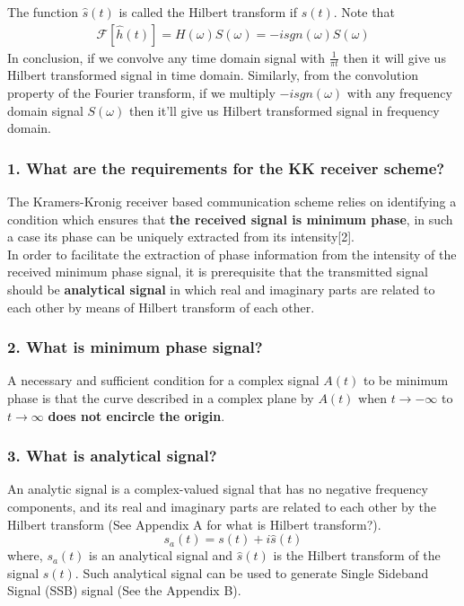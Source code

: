 The function $\hat{s}(t)$ is called the Hilbert transform if $s(t)$. Note that
\begin{equation}
\begin{split}
\mathcal{F}[\hat{h}(t)]=H(\omega)S(\omega)=-isgn(\omega)S(\omega)
\end{split}
\label{}
\end{equation}
In conclusion, if we convolve any time domain signal with $\frac{1}{\pi t}$ then it will give us Hilbert transformed signal in time domain. Similarly, from the convolution property of the Fourier transform, if we multiply $-isgn(\omega)$ with any frequency domain signal $S(\omega)$ then it'll give us Hilbert transformed signal in frequency domain.


\subsubsection{1. What are the requirements for the KK receiver scheme?}
The Kramers-Kronig receiver based communication scheme relies on identifying a condition which ensures that \textbf{the received signal is minimum phase}, in such a case its phase can be uniquely extracted from its intensity[2].\\ In order to facilitate the extraction of phase information from the intensity of the received minimum phase signal, it is prerequisite that the transmitted signal should be \textbf{analytical signal} in which real and imaginary parts are related to each other by means of Hilbert transform of each other.

\subsubsection{2. What is minimum phase signal?}
A necessary and sufficient condition for a complex signal $A(t)$ to be minimum phase is that the curve described in a complex plane by $A(t)$ when $t\rightarrow -\infty$ to $t\rightarrow \infty$ \textbf{does not encircle the origin}.

\subsubsection{3. What is analytical signal?}
An analytic signal is a complex-valued signal that has no negative frequency components, and its real and imaginary parts are related to each other by the Hilbert transform (See Appendix A for what is Hilbert transform?).
\begin{equation}
s_a(t)=s(t)+i\hat{s}(t)
\label{Analytical signal}
\end{equation}
where, $s_a(t)$ is an analytical signal and $\hat{s}(t)$ is the Hilbert transform of the signal ${s}(t)$. Such analytical signal can be used to generate Single Sideband Signal (SSB) signal (See the Appendix B).

